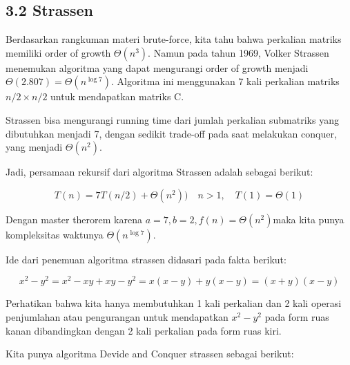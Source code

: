 \documentclass[
  letterpaper,
  DIV=11,
  numbers=noendperiod]{scrartcl}
\begin{document}
\hypertarget{strassen}{%
\subsection{3.2 Strassen}\label{strassen}}

Berdasarkan rangkuman materi brute-force, kita tahu bahwa perkalian
matriks memiliki order of growth \(\Theta(n^3)\). Namun pada tahun 1969,
Volker Strassen menemukan algoritma yang dapat mengurangi order of
growth menjadi \(\Theta({2.807}) = \Theta(n^{\log 7})\). Algoritma ini
menggunakan 7 kali perkalian matriks \(n/2 \times n/2\) untuk
mendapatkan matriks C.

Strassen bisa mengurangi running time dari jumlah perkalian submatriks
yang dibutuhkan menjadi 7, dengan sedikit trade-off pada saat melakukan
conquer, yang menjadi \(\Theta(n^2)\).

Jadi, persamaan rekursif dari algoritma Strassen adalah sebagai berikut:

\[T(n)=7 T(n / 2)+\Theta(n^2))\quad n>1, \quad T(1)=\Theta(1)\]

Dengan master therorem karena \(a=7, b=2, f(n)=\Theta(n^2)\)maka kita
punya kompleksitas waktunya \(\Theta(n^{\log 7})\).

Ide dari penemuan algoritma strassen didasari pada fakta berikut:

\[
x^2-y^2=x^2-x y+x y-y^2 =
x(x-y)+y(x-y)=(x+y)(x-y)
\]

Perhatikan bahwa kita hanya membutuhkan 1 kali perkalian dan 2 kali
operasi penjumlahan atau pengurangan untuk mendapatkan \(x^2-y^2\) pada
form ruas kanan dibandingkan dengan 2 kali perkalian pada form ruas
kiri.

Kita punya algoritma Devide and Conquer strassen sebagai berikut:
\end{document}
